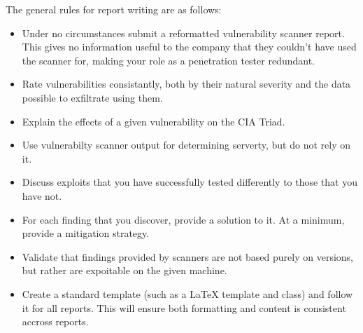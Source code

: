 		The general rules for report writing are as follows:
		\begin{itemize}
			\item Under no circumstances submit a reformatted vulnerability scanner report. 
				This gives no information useful to the company that they couldn't have used the scanner for, making your role as a penetration tester redundant. 
			\item Rate vulnerabilities consistantly, both by their natural severity and the data possible to exfiltrate using them. 
			\item Explain the effects of a given vulnerability on the CIA Triad. 
			\item Use vulnerabilty scanner output for determining serverty, but do not rely on it. 
			\item Discuss exploits that you have successfully tested differently to those that you have not. 
			\item For each finding that you discover, provide a solution to it. 
				At a minimum, provide a mitigation strategy. 
			\item Validate that findings provided by scanners are not based purely on versions, but rather are expoitable on the given machine. 
			\item Create a standard template (such as a \LaTeX{} template and class) and follow it for all reports. 
				This will ensure both formatting and content is consistent accross reports. 
		\end{itemize}

